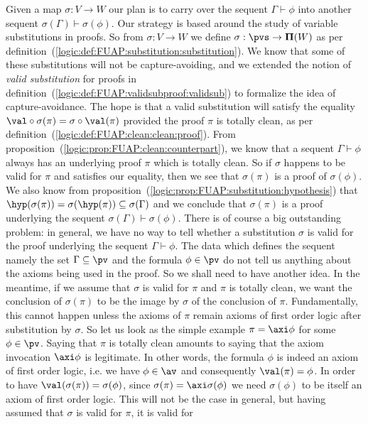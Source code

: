 Given a map $\sigma:V\to W$ our plan is to carry over the sequent
$\Gamma\vdash\phi$ into another sequent
$\sigma(\Gamma)\vdash\sigma(\phi)$. Our strategy is based around the
study of variable substitutions in proofs. So from $\sigma:V\to W$
we define $\sigma:\pvs\to{\bf\Pi}(W)$ as per
definition~(\ref{logic:def:FUAP:substitution:substitution}). We know
that some of these substitutions will not be capture-avoiding, and
we extended the notion of {\em valid substitution} for proofs in
definition~(\ref{logic:def:FUAP:validsubproof:validsub}) to
formalize the idea of capture-avoidance. The hope is that a valid
substitution will satisfy the equality
$\val\circ\sigma(\pi)=\sigma\circ\val(\pi)$ provided the proof $\pi$
is totally clean, as per
definition~(\ref{logic:def:FUAP:clean:clean:proof}). From
proposition~(\ref{logic:prop:FUAP:clean:counterpart}), we know that
a sequent $\Gamma\vdash\phi$ always has an underlying proof $\pi$
which is totally clean. So if $\sigma$ happens to be valid for $\pi$
and satisfies our equality, then we see that $\sigma(\pi)$ is a
proof of $\sigma(\phi)$. We also know from
proposition~(\ref{logic:prop:FUAP:substitution:hypothesis}) that
$\hyp(\sigma(\pi))=\sigma(\hyp(\pi))\subseteq\sigma(\Gamma)$ and we
conclude that $\sigma(\pi)$ is a proof underlying the sequent
$\sigma(\Gamma)\vdash\sigma(\phi)$. There is of course a big
outstanding problem: in general, we have no way to tell whether a
substitution $\sigma$ is valid for the proof underlying the sequent
$\Gamma\vdash\phi$. The data which defines the sequent namely the
set $\Gamma\subseteq\pv$ and the formula $\phi\in\pv$ do not tell us
anything about the axioms being used in the proof. So we shall need
to have another idea. In the meantime, if we assume that $\sigma$ is
valid for $\pi$ and $\pi$ is totally clean, we want the conclusion
of $\sigma(\pi)$ to be the image by $\sigma$ of the conclusion of
$\pi$. Fundamentally, this cannot happen unless the axioms of $\pi$
remain axioms of first order logic after substitution by $\sigma$.
So let us look as the simple example $\pi=\axi\phi$ for some
$\phi\in\pv$. Saying that $\pi$ is totally clean amounts to saying
that the axiom invocation $\axi\phi$ is legitimate. In other words,
the formula $\phi$ is indeed an axiom of first order logic, i.e. we
have $\phi\in\av$ and consequently $\val(\pi)=\phi$. In order to
have $\val(\sigma(\pi))=\sigma(\phi)$, since
$\sigma(\pi)=\axi\sigma(\phi)$ we need $\sigma(\phi)$ to be itself
an axiom of first order logic. This will not be the case in general,
but having assumed that $\sigma$ is valid for $\pi$, it is valid for
